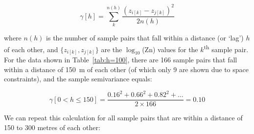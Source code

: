 \begin{equation}
\gamma[h] = \sum\limits_{k}^{n(h)}\frac{(z_{i[k]}-z_{j[k]})^2}{2 n(h)}
\end{equation}

\noindent where $n(h)$ is the number of sample pairs that fall within
a distance (or `lag') $h$ of each other, and $\{z_{i[k]},z_{j[k]}\}$
are the $\log_{10}$(Zn) values for the $k$\textsuperscript{th} sample
pair.  For the data shown in Table~\ref{tab:h=100}, there are 166
sample pairs that fall within a distance of 150~m of each other (of
which only 9 are shown due to space constraints), and the sample
semivariance equals:

\[
\gamma[0<h\leq{150}] =
\frac{0.16^2 + 0.66^2 + 0.82^2 + \ldots}{2 \times 166} = 0.10
\]

We can repeat this calculation for all sample pairs that are within a
distance of 150 to 300 metres of each other:

